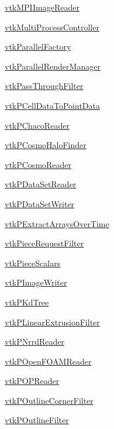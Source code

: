 \begin{DoxyItemize}
\item \hyperlink{vtkparallel_vtkmpiimagereader}{vtk\-M\-P\-I\-Image\-Reader}  
\item \hyperlink{vtkparallel_vtkmultiprocesscontroller}{vtk\-Multi\-Process\-Controller}  
\item \hyperlink{vtkparallel_vtkparallelfactory}{vtk\-Parallel\-Factory}  
\item \hyperlink{vtkparallel_vtkparallelrendermanager}{vtk\-Parallel\-Render\-Manager}  
\item \hyperlink{vtkparallel_vtkpassthroughfilter}{vtk\-Pass\-Through\-Filter}  
\item \hyperlink{vtkparallel_vtkpcelldatatopointdata}{vtk\-P\-Cell\-Data\-To\-Point\-Data}  
\item \hyperlink{vtkparallel_vtkpchacoreader}{vtk\-P\-Chaco\-Reader}  
\item \hyperlink{vtkparallel_vtkpcosmohalofinder}{vtk\-P\-Cosmo\-Halo\-Finder}  
\item \hyperlink{vtkparallel_vtkpcosmoreader}{vtk\-P\-Cosmo\-Reader}  
\item \hyperlink{vtkparallel_vtkpdatasetreader}{vtk\-P\-Data\-Set\-Reader}  
\item \hyperlink{vtkparallel_vtkpdatasetwriter}{vtk\-P\-Data\-Set\-Writer}  
\item \hyperlink{vtkparallel_vtkpextractarraysovertime}{vtk\-P\-Extract\-Arrays\-Over\-Time}  
\item \hyperlink{vtkparallel_vtkpiecerequestfilter}{vtk\-Piece\-Request\-Filter}  
\item \hyperlink{vtkparallel_vtkpiecescalars}{vtk\-Piece\-Scalars}  
\item \hyperlink{vtkparallel_vtkpimagewriter}{vtk\-P\-Image\-Writer}  
\item \hyperlink{vtkparallel_vtkpkdtree}{vtk\-P\-Kd\-Tree}  
\item \hyperlink{vtkparallel_vtkplinearextrusionfilter}{vtk\-P\-Linear\-Extrusion\-Filter}  
\item \hyperlink{vtkparallel_vtkpnrrdreader}{vtk\-P\-Nrrd\-Reader}  
\item \hyperlink{vtkparallel_vtkpopenfoamreader}{vtk\-P\-Open\-F\-O\-A\-M\-Reader}  
\item \hyperlink{vtkparallel_vtkpopreader}{vtk\-P\-O\-P\-Reader}  
\item \hyperlink{vtkparallel_vtkpoutlinecornerfilter}{vtk\-P\-Outline\-Corner\-Filter}  
\item \hyperlink{vtkparallel_vtkpoutlinefilter}{vtk\-P\-Outline\-Filter}  

\end{DoxyItemize}
